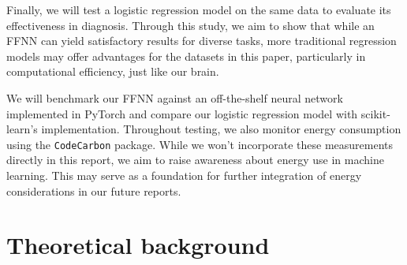 \documentclass{article}
\begin{document}
\begin{multicols}{2}
Finally, we will test a logistic regression model on the same data to evaluate its effectiveness in diagnosis. Through this study, we aim to show that while an FFNN can yield satisfactory results for diverse tasks, more traditional regression models may offer advantages for the datasets in this paper, particularly in computational efficiency, just like our brain.

We will benchmark our FFNN against an off-the-shelf neural network implemented in PyTorch and compare our logistic regression model with scikit-learn’s implementation. Throughout testing, we also monitor energy consumption using the \texttt{CodeCarbon} package. While we won't incorporate these measurements directly in this report, we aim to raise awareness about energy use in machine learning. This may serve as a foundation for further integration of energy considerations in our future reports.
\end{multicols}


\section*{Theoretical background}
\end{document}
